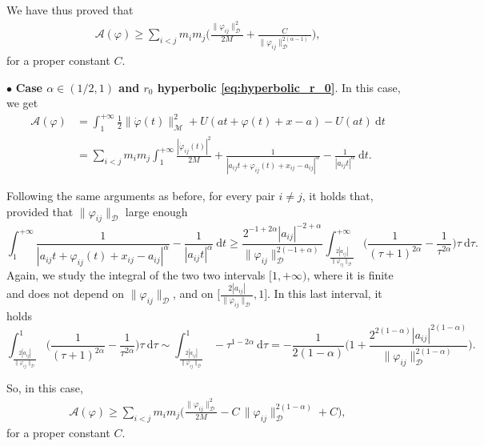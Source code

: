 \documentclass[a4paper,10pt]{amsart}
\newcommand{\ud}{\mathrm{d}}
\theoremstyle{plain}
\theoremstyle{definition}
\numberwithin{equation}{section}
\numberwithin{thm}{section}
\begin{document}
We have thus proved that
\begin{displaymath}
\begin{split}
    \mathcal{A}(\varphi) \ge  \sum_{i<j} m_i m_j \bigg( \frac{\|\varphi_{ij}\|_\mathcal{D}^2}{2M}+ \frac{C
    }{\|\varphi_{ij}\|_{\mathcal{D}}^{2(\alpha-1)}}\bigg),
\end{split}
\end{displaymath}
for a proper constant $C$.

\noindent $\bullet$ {\bf Case $\alpha \in (1/2,1)$ and $r_0$ hyperbolic \eqref{eq:hyperbolic_r_0}}.
In this case, we get
\[
\begin{split}
\mathcal{A}(\varphi) &= \int_{1}^{+\infty} \frac{1}{2}\|\dot\varphi(t)\|_\mathcal{M}^2+ U(at + \varphi(t) + x - a)-U(at)\ \ud t \\
&= \sum_{i<j} m_i m_j \int_{1}^{+\infty} \frac{|\dot{\varphi}_{ij}(t)|^2}{2M}+ \frac{1}{|a_{ij}t + \varphi_{ij}(t) + x_{ij} - a_{ij}|^\alpha}-\frac{1}{|a_{ij}t|^\alpha}\ \ud t.
\end{split}
\]

Following the same arguments as before, for every pair $i\neq j$, it holds that, provided that $\|\varphi_{ij}\|_\mathcal{D}$ large enough
\[
    \int_{1}^{+\infty} \frac{1}{|a_{ij}t + \varphi_{ij}(t) + x_{ij} - a_{ij}|^\alpha}-\frac{1}{|a_{ij}t|^\alpha}\ \ud t 
    \ge \frac{2^{-1+2\alpha}|a_{ij}|^{-2+\alpha}}{\|\varphi_{ij}\|_{\mathcal{D}}^{2(-1+\alpha)}} \int_{\frac{2|a_{ij}|}{\|\varphi_{ij}\|_\mathcal{D}}}^{+\infty} \bigg(\frac{1}{(\tau+1)^{2\alpha}}-\frac{1}{\tau^{2\alpha}}\bigg)\tau\ \ud \tau.
\]
Again, we study the integral of the two two intervals $[1,+\infty)$, where it is finite and does not depend on $\|\varphi_{ij}\|_\mathcal{D}$, and on $\big[\frac{2|a_{ij}|}{\|\varphi_{ij}\|_\mathcal{D}},1\big]$. In this last interval, it holds
\[
\int_{\frac{2|a_{ij}|}{\|\varphi_{ij}\|_\mathcal{D}}}^{1} \bigg(\frac{1}{(\tau+1)^{2\alpha}}-\frac{1}{\tau^{2\alpha}}\bigg)\tau\ \ud \tau \sim \int_{\frac{2|a_{ij}|}{\|\varphi_{ij}\|_\mathcal{D}}}^{1} -\tau^{1-2\alpha}\ \ud \tau = -\frac{1}{2(1-\alpha)}\bigg(1+\frac{2^{2(1-\alpha)}|a_{ij}|^{2(1-\alpha)}}{\|\varphi_{ij}\|_\mathcal{D}^{2(1-\alpha)}}\bigg).
\]

So, in this case,
\begin{displaymath}
\begin{split}
    \mathcal{A}(\varphi) \ge  \sum_{i<j} m_i m_j \bigg( \frac{\|\varphi_{ij}\|_\mathcal{D}^2}{2M}- C\,\|\varphi_{ij}\|_{\mathcal D}^{2(1-\alpha)}+ C\bigg),
\end{split}
\end{displaymath}
for a proper constant $C$.
\end{document}
